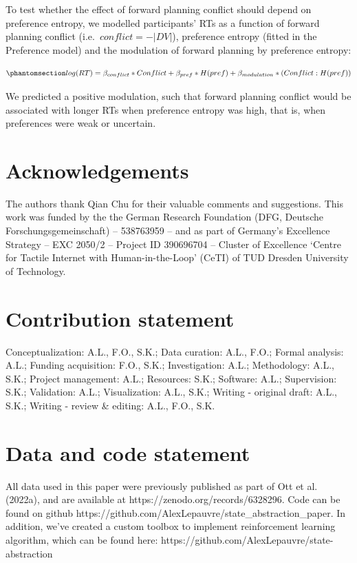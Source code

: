 \documentclass[
  letterpaper,
  DIV=11,
  numbers=noendperiod]{scrartcl}
\begin{document}
To test whether the effect of forward planning conflict should depend on
preference entropy, we modelled participants' RTs as a function of
forward planning conflict (i.e.~\(conflict = - |DV|\)), preference
entropy (fitted in the Preference model) and the modulation of forward
planning by preference entropy:

\begin{equation}\protect\phantomsection\label{eq-RT-model}{
log(RT) = \beta_{conflict} * Conflict + \beta_{pref} * H(pref) + \beta_{modulation} * (Conflict : H(pref))
}\end{equation}

We predicted a positive modulation, such that forward planning conflict
would be associated with longer RTs when preference entropy was high,
that is, when preferences were weak or uncertain.

\section{Acknowledgements}\label{acknowledgements}

The authors thank Qian Chu for their valuable comments and suggestions.
This work was funded by the the German Research Foundation (DFG,
Deutsche Forschungsgemeinschaft) -- 538763959 -- and as part of
Germany's Excellence Strategy -- EXC 2050/2 -- Project ID 390696704 --
Cluster of Excellence `Centre for Tactile Internet with
Human-in-the-Loop' (CeTI) of TUD Dresden University of Technology.

\section{Contribution statement}\label{contribution-statement}

Conceptualization: A.L., F.O., S.K.; Data curation: A.L., F.O.; Formal
analysis: A.L.; Funding acquisition: F.O., S.K.; Investigation: A.L.;
Methodology: A.L., S.K.; Project management: A.L.; Resources: S.K.;
Software: A.L.; Supervision: S.K.; Validation: A.L.; Visualization:
A.L., S.K.; Writing - original draft: A.L., S.K.; Writing - review \&
editing: A.L., F.O., S.K.

\section{Data and code statement}\label{data-and-code-statement}

All data used in this paper were previously published as part of Ott et
al. (2022a), and are available at https://zenodo.org/records/6328296.
Code can be found on github
https://github.com/AlexLepauvre/state\_abstraction\_paper. In addition,
we've created a custom toolbox to implement reinforcement learning
algorithm, which can be found here:
https://github.com/AlexLepauvre/state-abstraction
\end{document}
